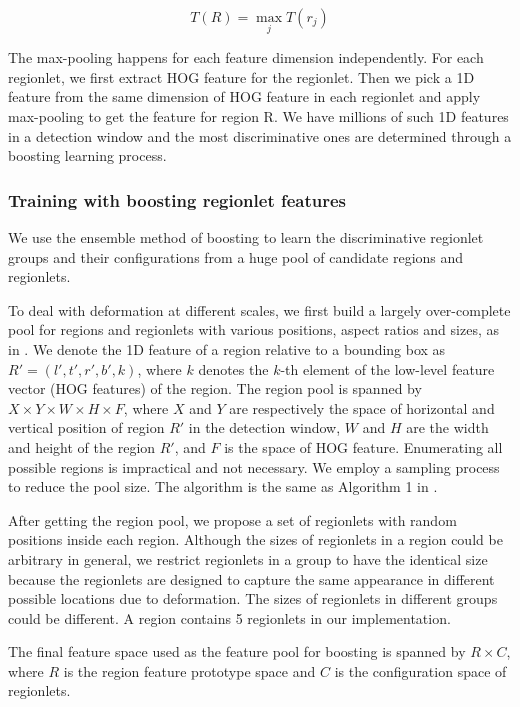 \documentclass{article} %
\begin{document}
\begin{equation}
T(R) = \max \limits_j T(r_j)
\end{equation}

The max-pooling happens for each feature dimension independently. For each regionlet, we first extract HOG feature for the regionlet. Then we pick a 1D feature from the same dimension of HOG feature in each regionlet and apply max-pooling to get the feature for region R. We have millions of such 1D features in a detection window and the most discriminative ones are determined through a boosting learning process.

\subsubsection{Training with boosting regionlet features}
\label{training_regionlets}

We use the ensemble method of boosting to learn the discriminative regionlet groups and their configurations from a huge pool of candidate regions and regionlets.

To deal with deformation at different scales, we first build a largely over-complete pool for regions and regionlets with various positions, aspect ratios and sizes, as in \cite{Wang2013}. 
We denote the 1D feature of a region relative to a bounding box as $R'= (l', t', r', b', k)$, where $k$ denotes the $k$-th element of the low-level feature vector (HOG features) of the region. The region pool is spanned by $X \times Y \times W \times H \times F$, where $X$ and $Y$ are respectively the space of horizontal and vertical position of region $R'$ in the detection window, $W$ and $H$ are the width and height of the region $R'$, and $F$ is the space of HOG feature. Enumerating all possible regions is impractical and not necessary. We employ a sampling process to reduce the pool size. The algorithm is the same as Algorithm 1 in \cite{Wang2013}.

After getting the region pool, we propose a set of regionlets with random positions inside each region. Although the sizes of regionlets in a region could be arbitrary in general, we restrict regionlets in a group to have the identical size because the regionlets are designed to capture the same appearance in different possible locations due to deformation\cite{Wang2013}. The sizes of regionlets in different groups could be different. A region contains 5 regionlets in our implementation.

The final feature space used as the feature pool for boosting is spanned by $R \times C$, where $R$ is the region feature prototype space and $C$ is the configuration space of regionlets.
\end{document}
